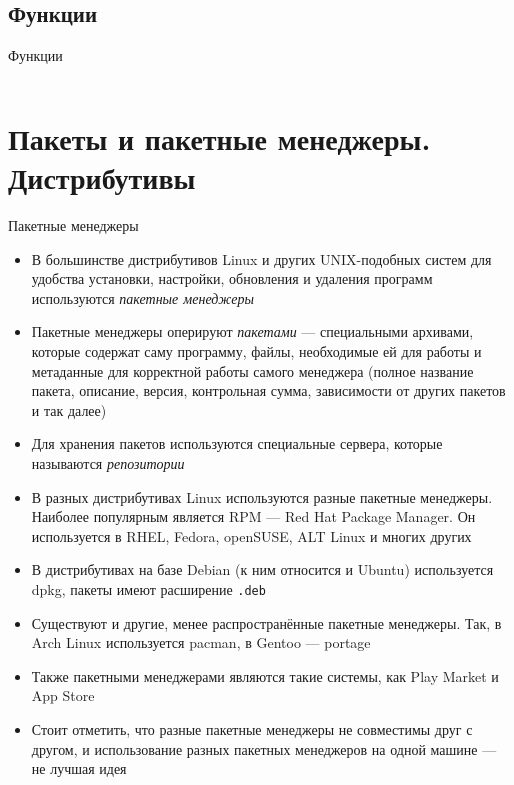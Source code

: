 \documentclass{beamer}
\begin{document}
\subsection{Функции}
\begin{frame}{Функции}
	\inputminted[linenos,bgcolor=listing]{bash}{files/unix_quickstart/functions.sh}
\end{frame}

\section{Пакеты и пакетные менеджеры. Дистрибутивы}

\begin{frame}{Пакетные менеджеры}
	\begin{itemize}
		\item{В большинстве дистрибутивов Linux и других UNIX-подобных систем для удобства установки, настройки, обновления и удаления программ используются \emph{пакетные менеджеры}}\pause
		\item{Пакетные менеджеры оперируют \emph{пакетами} --- специальными архивами, которые содержат саму программу, файлы, необходимые ей для работы и метаданные для корректной работы самого менеджера (полное название пакета, описание, версия, контрольная сумма, зависимости от других пакетов и так далее)}\pause
		\item{Для хранения пакетов используются специальные сервера, которые называются \emph{репозитории}}
	\end{itemize}
\end{frame}

\begin{frame}
	\begin{itemize}
		\item{В разных дистрибутивах Linux используются разные пакетные менеджеры. Наиболее популярным является RPM --- Red Hat Package Manager. Он используется в RHEL, Fedora, openSUSE, ALT Linux и многих других}\pause
		\item{В дистрибутивах на базе Debian (к ним относится и Ubuntu) используется dpkg, пакеты имеют расширение \texttt{.deb}}\pause
		\item{Существуют и другие, менее распространённые пакетные менеджеры. Так, в Arch Linux используется pacman, в Gentoo --- portage}\pause
		\item{Также пакетными менеджерами являются такие системы, как Play Market и App Store}\pause
		\item{Стоит отметить, что разные пакетные менеджеры не совместимы друг с другом, и использование разных пакетных менеджеров на одной машине --- не лучшая идея}
	\end{itemize}
\end{frame}
\end{document}
